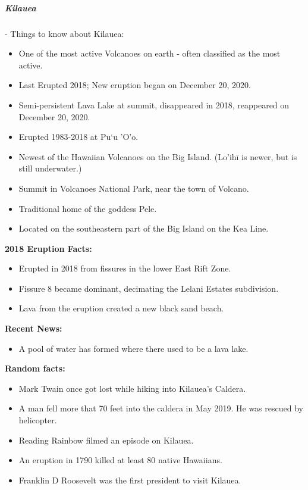 					\subparagraph{Kilauea} \label{Kilauea}- Things to know about Kilauea: 
						\begin{itemize}
							\item One of the most active Volcanoes on earth - often classified as the most active.
							\item Last Erupted 2018; New eruption began on December 20, 2020.
							\item Semi-persistent Lava Lake at summit, disappeared in 2018, reappeared on December 20, 2020.
							\item Erupted 1983-2018 at Pu`u 'O'o.
							\item Newest of the Hawaiian Volcanoes on the Big Island. (Lo'ih\=i is newer, but is still underwater.)
							\item Summit in Volcanoes National Park, near the town of Volcano.
							\item Traditional home of the goddess Pele.
							\item Located on the southeastern part of the Big Island on the Kea Line.
						\end{itemize}
						\textbf{2018 Eruption Facts: }
						\begin{itemize}
							\item Erupted in 2018 from fissures in the lower East Rift Zone. 
							\item Fissure 8 became dominant, decimating the Lelani Estates subdivision.
							\item Lava from the eruption created a new black sand beach. 
						\end{itemize}
						
						\textbf{Recent News: }
						\begin{itemize}
							\item A pool of water has formed where there used to be a lava lake. 
						\end{itemize}
						
						
						\textbf{Random facts:}
						\begin{itemize}
							\item Mark Twain once got lost while hiking into Kilauea's Caldera. 
							\item A man fell more that 70 feet into the caldera in May 2019.  He was rescued by helicopter. 
							\item Reading Rainbow filmed an episode on Kilauea.
							\item An eruption in 1790 killed at least 80 native Hawaiians. 
							\item Franklin D Roosevelt was the first president to visit Kilauea.
						\end{itemize}
				
